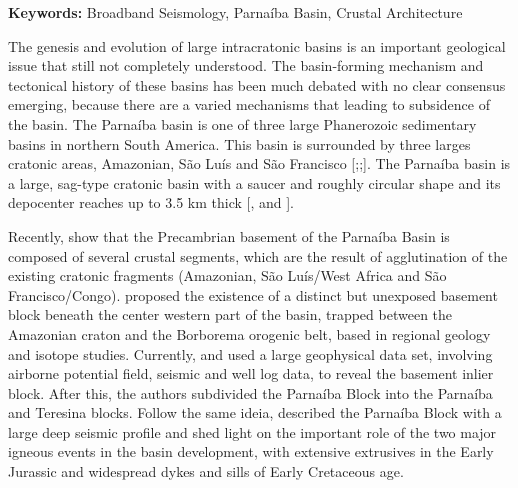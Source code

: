 \documentclass[paper,11pt]{geophysics}
\begin{document}
\bigskip 
\textbf{Keywords:} Broadband Seismology, Parnaíba Basin, Crustal Architecture


\bigskip 


The genesis and evolution of large intracratonic basins is an important geological issue that still not completely understood. The basin-forming mechanism and tectonical history of these basins has been much debated with no clear consensus emerging, because there are a varied mechanisms that leading to subsidence of the basin. The Parnaíba basin is one of three large Phanerozoic sedimentary basins in northern South America. This basin is surrounded by three	 larges cratonic areas, Amazonian, São Luís and São Francisco [\cite{de_almeida_brazilian_1981};\cite{de_brito_neves_neoproterozoic_2013};\cite{cordani_significance_2013}]. The Parnaíba basin is a large, sag-type cratonic basin with a saucer and roughly circular shape and its depocenter reaches up to 3.5 km thick [\cite{goes_feijo_1994}, \cite{vaz_bacia_2007} and \cite{daly_brasiliano_2014}].

Recently, \cite{fuck_rodinia_2008} show that the Precambrian basement of the Parnaíba Basin is composed of several crustal segments, which are the result of agglutination of the existing cratonic fragments (Amazonian, São Luís/West Africa and São Francisco/Congo). \cite{de_brito_neves_influence_1984} proposed the existence of a distinct but unexposed basement block beneath the center western part of the basin, trapped between the Amazonian craton and the Borborema orogenic belt, based in regional geology and isotope studies. Currently, \cite{de_castro_crustal_2014} and \cite{de_castro_geophysical_2016} used a large geophysical data set, involving airborne potential field, seismic and well log data, to reveal the basement inlier block. After this, the authors subdivided the Parnaíba Block into the Parnaíba and Teresina blocks. Follow the same ideia, \cite{daly_brasiliano_2014} described the Parnaíba Block with a large deep seismic profile and shed light on the important role of the two major igneous events in the basin development, with extensive extrusives in the Early Jurassic and widespread dykes and sills of Early Cretaceous age.
\end{document}
